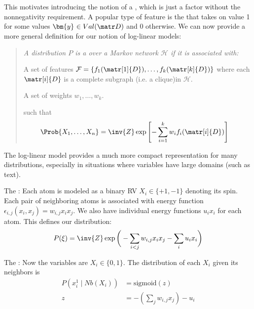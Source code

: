 \documentclass[11pt]{article}
\renewcommand\vec[2][]{\bm{#2}_{#1}}
\newcommand\myspace[1][]{\vspace{#1\bigskipamount}}
\begin{document}
\myspace{}
This motivates introducing the notion of a , which is just a factor without the nonnegativity requirement. A popular type of feature is the  that takes on value 1 for some values $\vec y \in Val(\matr D)$ and 0 otherwise. We can now provide a more general definition for our notion of log-linear models:
\vspace{-0.5em}
\begin{quote}
	{\itshape
	A distribution $P$ is a  over a Markov network $\mathcal H$ if it is associated with:
	\begin{compactitem}
		\item A set of features $\mathcal F = \{ f_1(\matr[1]{D}), \ldots, f_k(\matr[k]{D})  \}$ where each $\matr[i]{D}$ is a complete subgraph (i.e. a clique)in $\mathcal H$. 
		\item A set of weights $w_1, \ldots, w_k$. 
	\end{compactitem} 
	such that
	\begin{align}
		\Prob{X_1, \ldots, X_n} &= \inv{Z} \exp \left[ - \sum_{i =1}^{k} w_i f_i(\matr[i]{D})  \right]
	\end{align}
	}
\end{quote}
The log-linear model provides a much more compact representation for many distributions, especially in situations where variables have large domains (such as text).\\
\begin{example}
	The : Each atom is modeled as a binary RV $X_i \in \{+1, -1\}$ denoting its spin. Each pair of neighboring atoms is associated with energy function $\epsilon_{i,j}(x_i, x_j) = w_{i,j} x_i x_j$. We also have individual energy functions $u_i x_i$ for each atom. This defines our distribution:
	\begin{align}
		P(\xi) = \inv{Z} \exp \bigg( - \sum_{i < j} w_{i,j}x_i x_j - \sum_i u_i x_i   \bigg)
	\end{align}
	
	The : Now the variables are $X_i \in \{0, 1\}$. The distribution of each $X_i$ given its neighbors is 
	\begin{align}
		P(x_i^1 \mid Nb(X_i)) &= \text{sigmoid}(z) \\
		z &= -(\sum_j w_{i,j} x_j  )-u_i
	\end{align}
\end{example}
\end{document}
